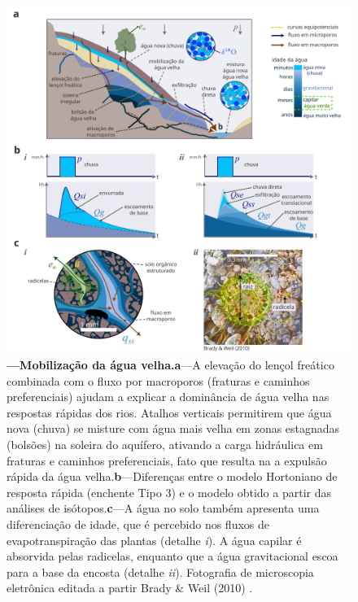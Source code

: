 \documentclass[./main.tex]{subfiles}
\begin{document}
\begin{figure}[t!] 
\centering				
\includegraphics[width=0.98\linewidth]{figs/fig_paradox.jpg}		
\caption[Mobilização da água velha]
{\textbf{---\;Mobilização da água velha.}\;\textbf{a}\;---\;A elevação do lençol freático combinada com o fluxo por macroporos (fraturas e caminhos preferenciais) ajudam a explicar a dominância de água velha nas respostas rápidas dos rios. Atalhos verticais permitirem que água nova (chuva) se misture com água mais velha em zonas estagnadas (bolsões) na soleira do aquífero, ativando a carga hidráulica em fraturas e caminhos preferenciais, fato que resulta na a expulsão rápida da água velha.\;\textbf{b}\;---\;Diferenças entre o modelo Hortoniano de resposta rápida (enchente Tipo 3) e o modelo obtido a partir das análises de isótopos.\;\textbf{c}\;---\;A água no solo também apresenta uma diferenciação de idade, que é percebido nos fluxos de evapotranspiração das plantas (detalhe \textrm{\textit{i}}). A água capilar é absorvida pelas radicelas, enquanto que a água gravitacional escoa para a base da encosta (detalhe \textrm{\textit{ii}}). Fotografia de microscopia eletrônica editada a partir Brady \& Weil (2010) \cite{brady2010}. 
}
\label{fig:hydro:paradox} 		
\end{figure}
\end{document}
